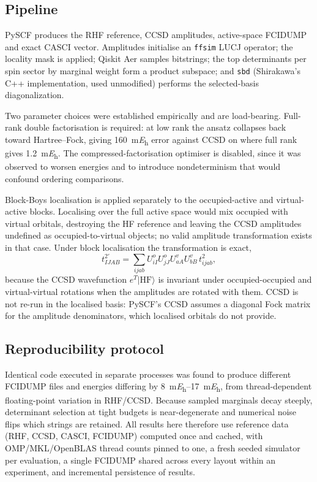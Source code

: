 \documentclass[11pt,a4paper]{article}
\begin{document}
\subsection{Pipeline}

PySCF produces the RHF reference, CCSD amplitudes, active-space FCIDUMP and
exact CASCI vector. Amplitudes initialise an \texttt{ffsim} LUCJ operator; the
locality mask is applied; Qiskit Aer samples bitstrings; the top determinants
per spin sector by marginal weight form a product subspace; and \texttt{sbd}
(Shirakawa's C++ implementation, used unmodified) performs the selected-basis
diagonalization.

Two parameter choices were established empirically and are load-bearing.
Full-rank double factorisation is required: at low rank the ansatz collapses
back toward Hartree--Fock, giving \SI{160}{\milli\hartree} error against CCSD
on  where full rank gives \SI{1.2}{\milli\hartree}. The
compressed-factorisation optimiser is disabled, since it was observed to
worsen energies and to introduce nondeterminism that would confound ordering
comparisons.

Block-Boys localisation is applied separately to the occupied-active and
virtual-active blocks. Localising over the full active space would mix
occupied with virtual orbitals, destroying the HF reference and leaving the
CCSD amplitudes undefined as occupied-to-virtual objects; no valid amplitude
transformation exists in that case. Under block localisation the
transformation is exact,
\begin{equation}
t^{2\prime}_{IJAB} = \sum_{ijab} U^{o}_{iI}U^{o}_{jJ}U^{v}_{aA}U^{v}_{bB}\,
t^{2}_{ijab},
\end{equation}
because the CCSD wavefunction $e^{T}\lvert\mathrm{HF}\rangle$ is invariant
under occupied-occupied and virtual-virtual rotations when the amplitudes are
rotated with them. CCSD is not re-run in the localised basis: PySCF's CCSD
assumes a diagonal Fock matrix for the amplitude denominators, which
localised orbitals do not provide.

\subsection{Reproducibility protocol}

Identical code executed in separate processes was found to produce different
FCIDUMP files and energies differing by \SIrange{8}{17}{\milli\hartree}, from
thread-dependent floating-point variation in RHF/CCSD. Because sampled
marginals decay steeply, determinant selection at tight budgets is
near-degenerate and numerical noise flips which strings are retained. All
results here therefore use reference data (RHF, CCSD, CASCI, FCIDUMP)
computed once and cached, with OMP/MKL/OpenBLAS thread counts pinned to one,
a fresh seeded simulator per evaluation, a single FCIDUMP shared across every
layout within an experiment, and incremental persistence of results.
\end{document}
